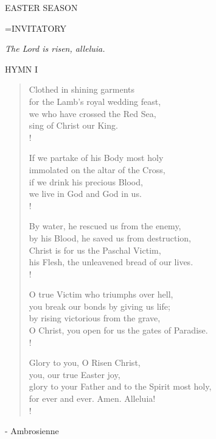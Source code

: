 \begin{center}\normalsize EASTER SEASON\\
\end{center}

\hangindent=\parindent \small{INVITATORY}
\begin{center}
\textit{The Lord is risen, alleluia.\\}
\end{center}

\noindent\small{\uppercase{Hymn I}}\normalsize
\begin{verse}
Clothed in shining garments\\
for the Lamb's royal wedding feast,\\
we who have crossed the Red Sea,\\
sing of Christ our King.\\!

If we partake of his Body most holy\\
immolated on the altar of the Cross,\\
if we drink his precious Blood,\\
we live in God and God in us.\\!

By water, he rescued us from the enemy,\\
by his Blood, he saved us from destruction,\\
Christ is for us the Paschal Victim,\\
his Flesh, the unleavened bread of our lives.\\!

O true Victim who triumphs over hell,\\
you break our bonds by giving us life;\\
by rising victorious from the grave,\\
O Christ, you open for us the gates of Paradise.\\!

Glory to you, O Risen Christ,\\
you, our true Easter joy,\\
glory to your Father and to the Spirit most holy,\\
for ever and ever. Amen. Alleluia!\\!
\end{verse}

- Ambrosienne

